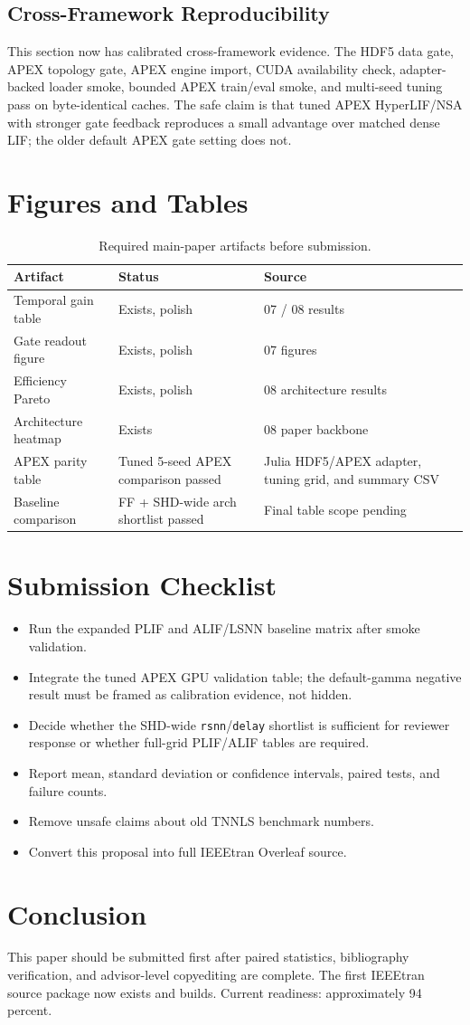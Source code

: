 \documentclass[journal]{IEEEtran}
\begin{document}
\subsection{Cross-Framework Reproducibility}
This section now has calibrated cross-framework evidence. The HDF5 data gate, APEX topology gate, APEX engine import, CUDA availability check, adapter-backed loader smoke, bounded APEX train/eval smoke, and multi-seed tuning pass on byte-identical caches. The safe claim is that tuned APEX HyperLIF/NSA with stronger gate feedback reproduces a small advantage over matched dense LIF; the older default APEX gate setting does not.

\section{Figures and Tables}
\begin{table}[t]
\centering
\caption{Required main-paper artifacts before submission.}
\begin{tabular}{lll}
\toprule
Artifact & Status & Source \\
\midrule
Temporal gain table & Exists, polish & 07 / 08 results \\
Gate readout figure & Exists, polish & 07 figures \\
Efficiency Pareto & Exists, polish & 08 architecture results \\
Architecture heatmap & Exists & 08 paper backbone \\
APEX parity table & Tuned 5-seed APEX comparison passed & Julia HDF5/APEX adapter, tuning grid, and summary CSV \\
Baseline comparison & FF + SHD-wide arch shortlist passed & Final table scope pending \\
\bottomrule
\end{tabular}
\end{table}

\section{Submission Checklist}
\begin{itemize}
  \item Run the expanded PLIF and ALIF/LSNN baseline matrix after smoke validation.
  \item Integrate the tuned APEX GPU validation table; the default-gamma negative result must be framed as calibration evidence, not hidden.
  \item Decide whether the SHD-wide \texttt{rsnn}/\texttt{delay} shortlist is sufficient for reviewer response or whether full-grid PLIF/ALIF tables are required.
  \item Report mean, standard deviation or confidence intervals, paired tests, and failure counts.
  \item Remove unsafe claims about old TNNLS benchmark numbers.
  \item Convert this proposal into full IEEEtran Overleaf source.
\end{itemize}

\section{Conclusion}
This paper should be submitted first after paired statistics, bibliography verification, and advisor-level copyediting are complete. The first IEEEtran source package now exists and builds. Current readiness: approximately 94 percent.
\end{document}
